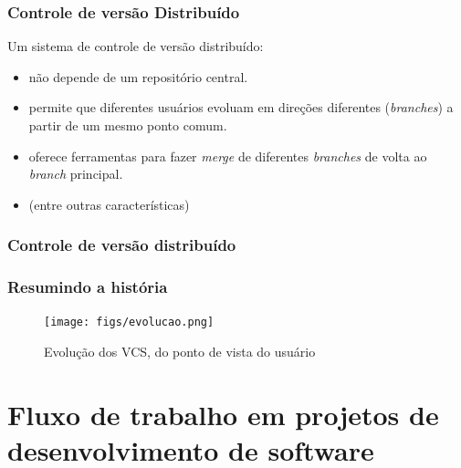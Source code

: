 \documentclass{beamer}
\begin{document}
\begin{frame}
  \frametitle{Controle de versão Distribuído}

  Um sistema de controle de versão distribuído:

  \begin{itemize}
      \pause
    \item não depende de um repositório central.
      \pause
    \item permite que diferentes usuários evoluam em direções diferentes
      (\emph{branches}) a partir de um mesmo ponto comum.
      \pause
    \item oferece ferramentas para fazer \emph{merge} de diferentes
      \emph{branches} de volta ao \emph{branch} principal.
      \pause
    \item (entre outras características)
  \end{itemize}
\end{frame}

\begin{frame}
  \frametitle{Controle de versão distribuído}
  \begin{figure}[h]
    \begin{center}
    \end{center}
    \label{fig:distributed-vcs}
  \end{figure}
\end{frame}

\begin{frame}
  \frametitle{Resumindo a história}
  \begin{figure}[h]
    \begin{center}
      \texttt{[image: figs/evolucao.png]}
    \end{center}
    \caption{Evolução dos VCS, do ponto de vista do usuário}
    \label{fig:evolucao}
  \end{figure}
\end{frame}

\section[Fluxo de Trabalho]{Fluxo de trabalho em projetos de desenvolvimento de software}
\end{document}
